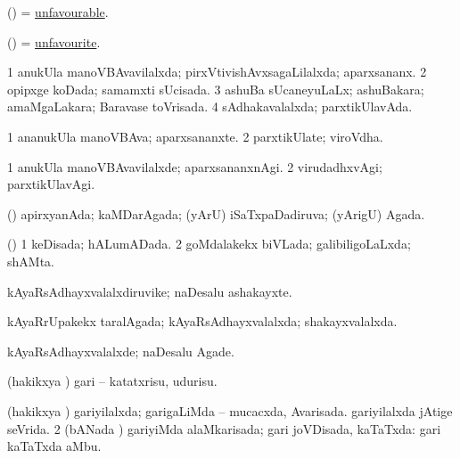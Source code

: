\bentry
{} 
\gl{\gu}
\expl{}
\bmng
 (\ame) = \hyperlink{unfavourable}{unfavourable}. 
\emng
\eentry

\bentry
{} 
\gl{\gu}
\expl{}
\bmng
 (\ame) = \hyperlink{unfavourite}{unfavourite}. 
\emng
\eentry

\bentry
{} 
\gl{\gu}
\expl{}
\bmng
\bnum
\num{1} anukUla manoVBAvavilalxda; pirxVtivishAvxsagaLilalxda; aparxsananx. 
\num{2} opipxge koDada; samamxti sUcisada. 
\num{3} ashuBa sUcaneyuLaLx; ashuBakara; amaMgaLakara; Baravase toVrisada. 
\num{4} sAdhakavalalxda; parxtikUlavAda. 
\enum
\emng
\eentry

\bentry
{} 
\gl{\nA}
\expl{}
\bmng
\bnum
\num{1} ananukUla manoVBAva; aparxsananxte. 
\num{2} parxtikUlate; viroVdha. 
\enum
\emng
\eentry

\bentry
{} 
\gl{\kirxvi}
\expl{}
\bmng
\bnum
\num{1} anukUla manoVBAvavilalxde; aparxsananxnAgi. 
\num{2} virudadhxvAgi; parxtikUlavAgi. 
\enum
\emng
\eentry

\bentry
{} 
\gl{\gu}
\expl{}
\bmng
 (\AmA) apirxyanAda; kaMDarAgada; (yArU) iSaTxpaDadiruva; (yArigU) Agada. 
\emng
\eentry

\bentry
{} 
\gl{\gu}
\expl{}
\bmng
(\AmA) 
\bnum
\num{1} keDisada; hALumADada. 
\num{2} goMdalakekx biVLada; galibiligoLaLxda; shAMta. 
\enum
\emng
\eentry

\bentry
{} 
\gl{\nA}
\expl{}
\bmng
kAyaRsAdhayxvalalxdiruvike; naDesalu ashakayxte. 
\emng
\eentry

\bentry
{} 
\gl{\gu}
\expl{}
\bmng
 kAyaRrUpakekx taralAgada; kAyaRsAdhayxvalalxda; shakayxvalalxda. 
\emng
\eentry

\bentry
{} 
\gl{\kirxvi}
\expl{}
\bmng
 kAyaRsAdhayxvalalxde; naDesalu Agade. 
\emng
\eentry

\bentry
{} 
\gl{\sakirx}
\expl{}
\bmng
 (hakikxya \vi) gari -- katatxrisu, udurisu. 
\emng
\eentry

\bentry
{} 
\gl{\gu}
\expl{}
\bmng
\bnum
{} (hakikxya \vi) 
\banum
{} gariyilalxda; garigaLiMda -- mucacxda, Avarisada. 
 gariyilalxda jAtige seVrida. 
\eanum
\numie
\num{2} (bANada \vi) gariyiMda alaMkarisada; gari joVDisada, kaTaTxda:  gari kaTaTxda aMbu. 
\enum
\emng
\eentry

